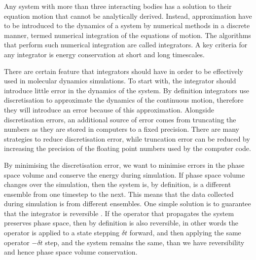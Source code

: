 Any system with more than three interacting bodies has a solution to their equation motion that cannot be analytically derived. Instead, approximation have to be introduced to the dynamics of a system by numerical methods in a discrete manner, termed numerical integration of the equations of motion. The algorithms that perform such numerical integration are called integrators. A key criteria for any integrator is energy conservation at short and long timescales.

There are certain feature that integrators should have in order to be effectively used in molecular dynamics simulations. To start with, the integrator should introduce little error in the dynamics of the system. By definition integrators use discretisation to approximate the dynamics of the continuous motion, therefore they will introduce an error because of this approximation. Alongside discretisation errors, an additional source of error comes from truncating the numbers as they are stored in computers to a fixed precision. There are many strategies to reduce discretisation error, while truncation error can be reduced by increasing the precision of the floating point numbers used by the computer code.

By minimising the discretisation error, we want to minimise errors in the phase space volume and conserve the energy during simulation. If phase space volume changes over the simulation, then the system is, by definition, is a different ensemble from one timestep to the next. This means that the data collected during simulation is from different ensembles. One simple solution is to guarantee that the integrator is reversible \cite{tuckerman1992reversible}. If the operator that propagates the system preserves phase space, then by definition is also reversible, in other words the operator is applied to a state stepping $\delta t$ forward, and then applying the same operator $-\delta t$ step, and the system remains the same, than we have reversibility and hence phase space volume conservation. 